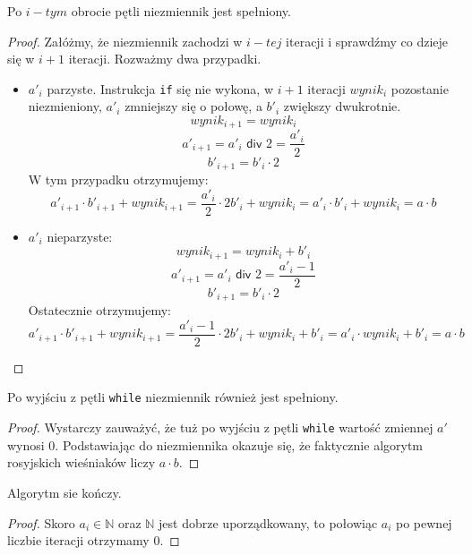 \begin{lemma}
Po $i-tym$ obrocie pętli niezmiennik jest spełniony.
\end{lemma}
\begin{proof}
Załóżmy, że niezmiennik zachodzi w $i-tej$ iteracji i sprawdźmy co dzieje się w $i+1$ iteracji.
Rozważmy dwa przypadki.


\begin{itemize}
    \item $a'_i$ parzyste. Instrukcja \texttt{if} się nie wykona, w $i+1$ iteracji $wynik_i$ pozostanie niezmieniony, $a'_i$ zmniejszy się o połowę, a $b'_i$ zwiększy dwukrotnie. 
    \[
      wynik_{i+1} = wynik_i
    \]
    \[
      a'_{i+1} = a'_i \textsf{ div } 2 = \frac{a'_i}{2}
    \]
    \[
      b'_{i+1} = b'_i \cdot 2
    \]
    W tym przypadku otrzymujemy:
    \[
      a'_{i+1} \cdot b'_{i+1} + wynik_{i+1} = \frac{a'_i}{2} \cdot 2 b'_i + wynik_i = a'_i \cdot b'_i + wynik_i = a \cdot b
    \]

    \item $a'_i$ nieparzyste:
    \[
      wynik_{i+1} = wynik_i + b'_i
    \]
    \[
      a'_{i+1} = a'_i \textsf{ div } 2 = \frac{a'_i-1}{2}
    \]
    \[
      b'_{i+1} = b'_i \cdot 2
    \]
    Ostatecznie otrzymujemy:
    \[
      a'_{i+1} \cdot b'_{i+1} + wynik_{i+1} = \frac{a'_i-1}{2} \cdot 2 b'_i + wynik_i +b'_i = a'_i \cdot wynik_i + b'_i= a \cdot b
    \]

\end{itemize}

\end{proof}

\begin{lemma}
Po wyjściu z pętli \texttt{while} niezmiennik również jest spełniony.
\end{lemma}
\begin{proof}
Wystarczy zauważyć, że tuż po wyjściu z pętli \texttt{while} wartość zmiennej $a'$ wynosi $0$.
Podstawiając do niezmiennika okazuje się, że faktycznie algorytm rosyjskich wieśniaków liczy $a \cdot b$.
\end{proof}

\begin{lemma}
Algorytm sie kończy.
\end{lemma}
\begin{proof}
Skoro $a_i \in \mathbb{N} $ oraz $\mathbb{N}$ jest dobrze uporządkowany, to połowiąc $a_i$ po pewnej liczbie iteracji otrzymamy 0.
\end{proof}

